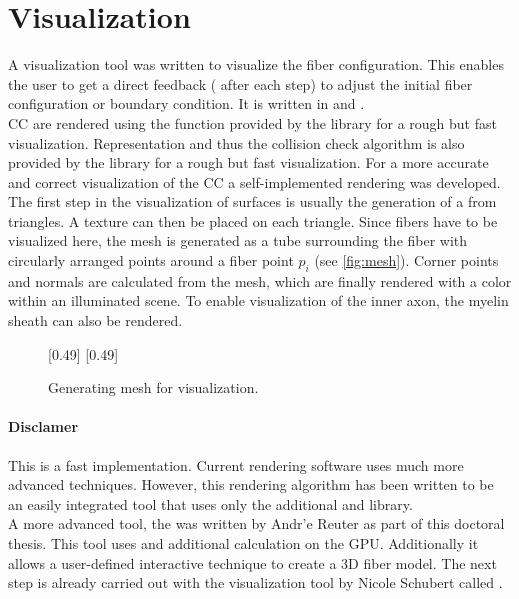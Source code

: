 \section{Visualization}
% 
A visualization tool was written to visualize the fiber configuration.
This enables the user to get a direct feedback (\eg{} after each step) to adjust the initial fiber configuration or boundary condition.
It is written in \cpp{} and \opengl{} \cite{isocpp, khronos}.
\\
% 
\ac{CC} are rendered using the  function provided by the  library for a rough but fast visualization.
Representation and thus the collision check algorithm is also provided by the  library for a rough but fast visualization.
For a more accurate and correct visualization of the \ac{CC} a self-implemented rendering was developed.
The first step in the visualization of surfaces is usually the generation of a  from triangles.
A texture can then be placed on each triangle.
Since fibers have to be visualized here, the mesh is generated as a tube surrounding the fiber with circularly arranged points around a fiber point $p_i$ (see \cref{fig:mesh}).
Corner points and normals are calculated from the mesh, which are finally rendered with a color within an illuminated scene.
To enable visualization of the inner axon, the myelin sheath can also be rendered.

% 
\begin{figure}[!t]
    \setlength{\tikzwidth}{0.5\textwidth}
    [0.49\textwidth]{
    }
    [0.49\textwidth]{
    }
	\caption{Generating mesh for visualization.}
	\label{fig:vis_mesh}
\end{figure}
% 
\paragraph{Disclamer}
This is a fast implementation.
Current rendering software uses much more advanced techniques.
However, this rendering algorithm has been written to be an easily integrated tool that uses only the additional  and  library.
\\
% 
A more advanced tool, the  \cite{Reuter2019} was written by Andr'e Reuter as part of this doctoral thesis.
This tool uses  and additional calculation on the GPU. Additionally it allows a user-defined interactive technique to create a 3D fiber model.
The next step is already carried out with the visualization tool by Nicole Schubert called .
% 
